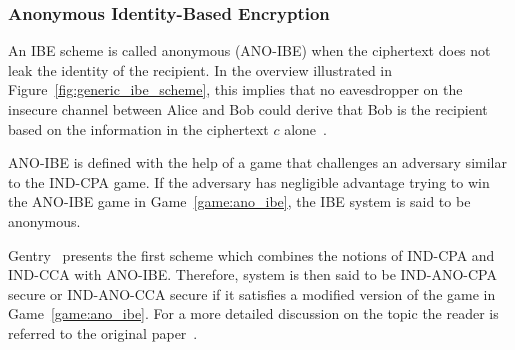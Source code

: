 \subsubsection{Anonymous Identity-Based Encryption}
An IBE scheme is called anonymous (ANO-IBE) when the ciphertext does not leak the identity of the recipient. In the overview illustrated in Figure~\ref{fig:generic_ibe_scheme}, this implies that no eavesdropper on the insecure channel between Alice and Bob could derive that Bob is the recipient based on the information in the ciphertext $c$ alone~\cite{art:BoyenW06}.

ANO-IBE is defined with the help of a game that challenges an adversary similar to the IND-CPA game. If the adversary has negligible advantage trying to win the ANO-IBE game in Game~\ref{game:ano_ibe}, the IBE system is said to be anonymous.

Gentry~\cite{art:Gentry06} presents the first scheme which combines the notions of IND-CPA and IND-CCA with ANO-IBE. Therefore, system is then said to be IND-ANO-CPA secure or IND-ANO-CCA secure if it satisfies a modified version of the game in Game~\ref{game:ano_ibe}. For a more detailed discussion on the topic the reader is referred to the original paper~\cite{art:Gentry06}.

